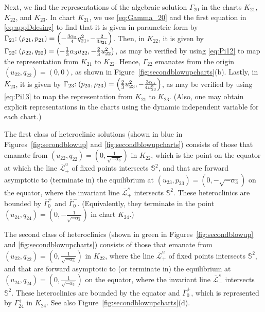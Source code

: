 \documentclass[11pt]{article}
\numberwithin{equation}{section}
\begin{document}
Next, we find the representations of the algebraic solution $\Gamma_{20}$ in the charts $K_{21}$, $K_{22}$, and $K_{23}$.
In chart $K_{21}$, we use \eqref{eq:Gamma_20} and the first equation in \eqref{eq:appDdesing} to find that it is given in parametric form by
$\Gamma_{21} \hspace{-0.04truein}: (\rho_{21},p_{21}) = \left( - \frac{3\alpha_3}{4} q_{21}^2, -\frac{2}{3 q_{21}}\right)$.
Then, in $K_{22}$, it is given by
$\Gamma_{22}\hspace{-0.04truein}: (\rho_{22},q_{22}) = \left( - \tfrac{1}{3}\alpha_3 u_{22}, -\tfrac{2}{3} u_{22}^2 \right)$,
as may be verified by using \eqref{eq:Pi12} to map the representation from $K_{21}$ to $K_{22}$. 
Hence, $\Gamma_{22}$ emanates from the origin $(u_{22},q_{22})=(0,0)$, as shown in Figure~\ref{fig:secondblowupcharts}(b). 
Lastly, in $K_{23}$, it is given by 
$\Gamma_{23}\hspace{-0.04truein}: (p_{23},\rho_{23}) = \left( \tfrac{2}{3} u_{23}^2, -\tfrac{3\alpha_3}{4u_{23}^3} \right)$,
as may be verified by using \eqref{eq:Pi13} to map the representation from $K_{21}$ to $K_{23}$. 
(Also, one may obtain explicit representations in the charts using the dynamic independent variable for each chart.)

The first class of heteroclinic solutions (shown in blue in Figures~\ref{fig:secondblowup} and \ref{fig:secondblowupcharts}) consists of those that emanate from $(u_{22},q_{22})=(0,\frac{1}{\sqrt{-\alpha_3}})$ in $K_{22}$, which is the point on the equator at which the line $\overline{\mathcal{L}}^u_+$ of fixed points intersects $\mathbb{S}^2$, and that are forward asymptotic to (terminate in) the equilibrium at $(u_{23},p_{23})=(0,-\sqrt{-\alpha_3})$ on the equator, where the invariant line $\overline{\mathcal{L}}_+^s$ intersects $\mathbb{S}^2$.
These heteroclinics are bounded by $\overline{\Gamma}_0^+$ and $\bar{\Gamma}_0^-$.
(Equivalently, they terminate in the point $(u_{24},q_{24})=(0,-\frac{1}{\sqrt{-\alpha_3}})$ in chart $K_{24}$.)

The second class of heteroclinics (shown in green in Figures~\ref{fig:secondblowup} and \ref{fig:secondblowupcharts}) consists of those that emanate from $(u_{22},q_{22})=(0,\frac{1}{\sqrt{-\alpha_3}})$ in $K_{22}$, where the line $\overline{\mathcal{L}}^u_+$ of fixed points intersects $\mathbb{S}^2$, and that are forward asymptotic to (or terminate in) the equilibrium at $(u_{24},q_{24})=(0,\frac{1}{\sqrt{-\alpha_3}})$ on the equator, where the invariant line $\overline{\mathcal{L}}_-^s$ intersects $\mathbb{S}^2$.
These heteroclinics are bounded by the equator and $\overline{\Gamma}_0^+$, which is represented by $\Gamma_{24}^+$ in $K_{24}$.
See also Figure~\ref{fig:secondblowupcharts}(d).
\end{document}
